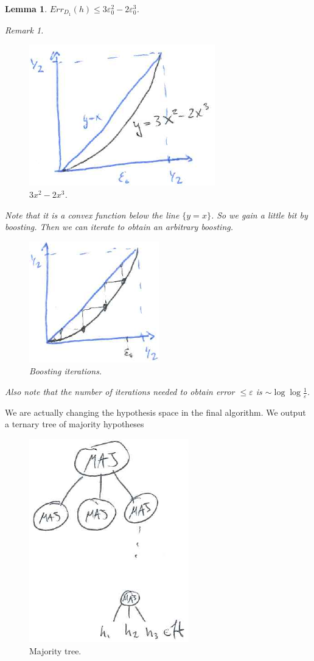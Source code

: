 \documentclass[12pt, letterpaper]{article}
\numberwithin{equation}{section} %
\newcommand{\ve}{\varepsilon}
\newtheorem{lemma}[theorem]{Lemma}
\theoremstyle{definition}
\theoremstyle{remark}
\newtheorem{remark}[theorem]{Remark}
\begin{document}
\begin{lemma}
$Err_{D_1}(h) \leq 3\ve_0^2 - 2\ve_0^3$.
\begin{remark}
\begin{figure}[H]
\centering
\includegraphics[width=0.3\linewidth]{img/boosting-bound.png}
\caption{$3x^2 - 2x^3$.}
\end{figure}
Note that it is a convex function below the line $\lbrace y = x\rbrace$. So we gain a little bit by boosting. Then we can iterate to obtain an arbitrary boosting.
\begin{figure}[H]
\centering
\includegraphics[width=0.3\linewidth]{img/boosting-iteration.png}
\caption{Boosting iterations.}
\end{figure}
Also note that the number of iterations needed to obtain error $\leq \ve$ is $\sim \log\log\frac1\ve$.
\end{remark}
\end{lemma}

We are actually changing the hypothesis space in the final algorithm. We output a ternary tree of majority hypotheses
\begin{figure}[H]
\centering
\includegraphics[width=0.3\linewidth]{img/majority-tree.png}
\caption{Majority tree.}
\end{figure}
\end{document}
